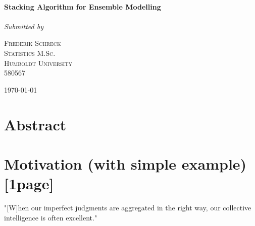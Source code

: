 \documentclass[12pt]{article}
\begin{document}
\begin{titlepage}
	\center
	\HRule\\[0.4cm]
	
	{\LARGE\bfseries Stacking Algorithm for Ensemble Modelling}\\[0.05cm] %
		\HRule\\[1.5cm]
	
			
			\textit{Submitted by}\\	
			\vspace{0.5cm}
			

	\begin{minipage}{0.5\textwidth}
		\begin{center}
			\large

			\textsc{Frederik Schreck \\
			Statistics M.Sc.\\
			Humboldt University\\
			580567} %
		\end{center}

	\end{minipage}
	

	\vfill\vfill\vfill\vfill %
	
	{\large\today} %
	
	\vfill %
	
\end{titlepage}


\tableofcontents
\thispagestyle{empty}
\clearpage
\setcounter{page}{1}
\newpage

\listoffigures
\listoftables
\thispagestyle{empty}
\clearpage
\setcounter{page}{1}



\section{Abstract}

\section{Motivation (with simple example)[1page]}\label{Intro}
"[W]hen our imperfect judgments are aggregated in the right way, our collective intelligence is often excellent."\citep[Foreword p.XIV]{surowiecki2005wisdom}\\
\end{document}
